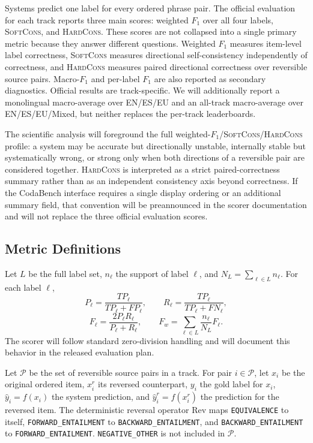 \documentclass[11pt]{article}
\newcommand{\SoftCons}{\textsc{SoftCons}}
\newcommand{\HardCons}{\textsc{HardCons}}
\newcommand{\Rev}{\mathrm{Rev}}
\begin{document}
Systems predict one label for every ordered phrase pair.
The official evaluation for each track reports three main scores: weighted $F_1$ over all four labels, \SoftCons{}, and \HardCons{}.
These scores are not collapsed into a single primary metric because they answer different questions.
Weighted $F_1$ measures item-level label correctness, \SoftCons{} measures directional self-consistency independently of correctness, and \HardCons{} measures paired directional correctness over reversible source pairs.
Macro-$F_1$ and per-label $F_1$ are also reported as secondary diagnostics.
Official results are track-specific.
We will additionally report a monolingual macro-average over EN/ES/EU and an all-track macro-average over EN/ES/EU/Mixed, but neither replaces the per-track leaderboards.

The scientific analysis will foreground the full weighted-$F_1$/\SoftCons{}/\HardCons{} profile: a system may be accurate but directionally unstable, internally stable but systematically wrong, or strong only when both directions of a reversible pair are considered together.
\HardCons{} is interpreted as a strict paired-correctness summary rather than as an independent consistency axis beyond correctness.
If the CodaBench interface requires a single display ordering or an additional summary field, that convention will be preannounced in the scorer documentation and will not replace the three official evaluation scores.

\subsection{Metric Definitions}

Let $L$ be the full label set, $n_\ell$ the support of label $\ell$, and $N_L=\sum_{\ell\in L}n_\ell$.
For each label $\ell$,
\[
P_\ell=\frac{TP_\ell}{TP_\ell+FP_\ell}, \qquad
R_\ell=\frac{TP_\ell}{TP_\ell+FN_\ell},
\]
\[
F_\ell=\frac{2P_\ell R_\ell}{P_\ell+R_\ell}, \qquad
F_w=\sum_{\ell\in L}\frac{n_\ell}{N_L}F_\ell .
\]
The scorer will follow standard zero-division handling and will document this behavior in the released evaluation plan.

Let $\mathcal{P}$ be the set of reversible source pairs in a track.
For pair $i\in\mathcal{P}$, let $x_i$ be the original ordered item, $x_i^r$ its reversed counterpart, $y_i$ the gold label for $x_i$, $\hat{y}_i=f(x_i)$ the system prediction, and $\hat{y}_i^r=f(x_i^r)$ the prediction for the reversed item.
The deterministic reversal operator $\Rev$ maps \texttt{EQUIVALENCE} to itself, \texttt{FORWARD\_ENTAILMENT} to \texttt{BACKWARD\_ENTAILMENT}, and \texttt{BACKWARD\_ENTAILMENT} to \texttt{FORWARD\_ENTAILMENT}.
\texttt{NEGATIVE\_OTHER} is not included in $\mathcal{P}$.
\end{document}
